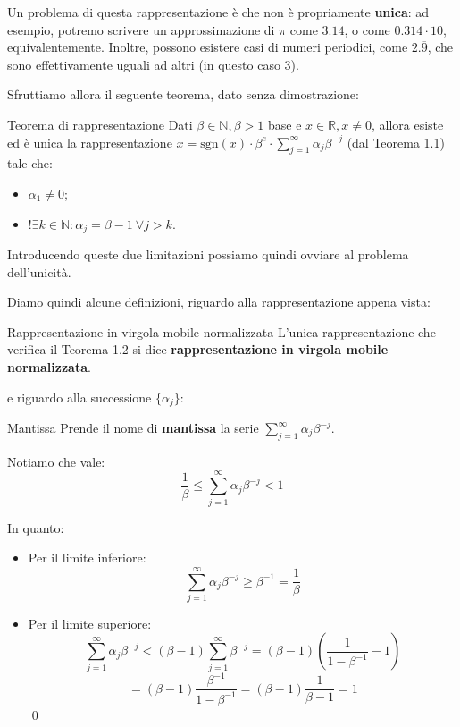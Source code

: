 \documentclass[a4paper,11pt]{article}
\begin{document}
Un problema di questa rappresentazione è che non è propriamente \textbf{unica}: ad esempio, potremo scrivere un approssimazione di $\pi$ come $3.14$, o come $0.314 \cdot 10$, equivalentemente.
Inoltre, possono esistere casi di numeri periodici, come $2.\overline{9}$, che sono effettivamente uguali ad altri (in questo caso $3$).

Sfruttiamo allora il seguente teorema, dato senza dimostrazione:
\begin{theorem}{Teorema di rappresentazione}
	Dati $\beta \in \mathbb{N}, \beta > 1$ base e $x \in \mathbb{R}, x \neq 0$, allora esiste ed è unica la rappresentazione $x = \mathrm{sgn}(x) \cdot \beta^e \cdot \sum_{j=1}^\infty \alpha_j \beta^{-j}$ (dal Teorema 1.1) tale che:
	\begin{itemize}
		\item $\alpha_1 \neq 0$;
		\item $!\exists k \in \mathbb{N} : \alpha_j = \beta - 1 \ \forall j > k$.
	\end{itemize}
\end{theorem}

Introducendo queste due limitazioni possiamo quindi ovviare al problema dell'unicità.

Diamo quindi alcune definizioni, riguardo alla rappresentazione appena vista:

\begin{definition}{Rappresentazione in virgola mobile normalizzata}
	L'unica rappresentazione che verifica il Teorema 1.2 si dice \textbf{rappresentazione in virgola mobile normalizzata}.
\end{definition}

e riguardo alla successione $\{\alpha_j\}$:

\begin{definition}{Mantissa}
	Prende il nome di \textbf{mantissa} la serie $\sum_{j=1}^\infty \alpha_j \beta^{-j}$.
\end{definition}

Notiamo che vale:
$$
\frac{1}{\beta} \leq \sum_{j=1}^\infty \alpha_j \beta^{-j} < 1
$$

In quanto:
\begin{itemize}
	\item Per il limite inferiore: 
		$$
			\sum_{j=1}^\infty \alpha_j \beta^{-j} \geq \beta^{-1} = \frac{1}{\beta}
		$$
	\item Per il limite superiore:
		$$
		\sum_{j=1}^\infty \alpha_j \beta^{-j} < (\beta - 1) \sum_{j=1}^\infty \beta^{-j} = (\beta - 1) \left( \frac{1}{1 - \beta^{-1}} - 1 \right) 
		$$ 
		$$
		= (\beta - 1) \frac{\beta^{-1}}{1-\beta^{-1}} = (\beta - 1) \frac{1}{\beta - 1} = 1
		$$
		\qed
\end{itemize}
\end{document}
